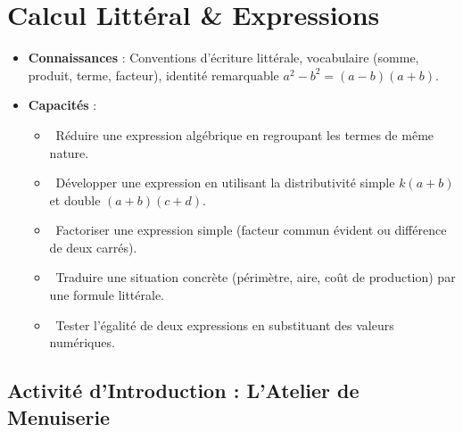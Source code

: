 \chapter{Calcul Littéral \& Expressions}
\label{chap:calcul_litteral}

\begin{cadreretenu}
\begin{itemize}
    \item \textbf{Connaissances} : Conventions d'écriture littérale, vocabulaire (somme, produit, terme, facteur), identité remarquable $a^2 - b^2 = (a-b)(a+b)$.
    \item \textbf{Capacités} :
    \begin{itemize}
        \item \capRealiser\ Réduire une expression algébrique en regroupant les termes de même nature.
        \item \capRealiser\ Développer une expression en utilisant la distributivité simple $k(a+b)$ et double $(a+b)(c+d)$.
        \item \capRealiser\ Factoriser une expression simple (facteur commun évident ou différence de deux carrés).
        \item \capAnalyser\ Traduire une situation concrète (périmètre, aire, coût de production) par une formule littérale.
        \item \capValider\ Tester l'égalité de deux expressions en substituant des valeurs numériques.
    \end{itemize}
\end{itemize}
\end{cadreretenu}

\vspace{0.3cm}

\section{Activité d'Introduction : L'Atelier de Menuiserie}

